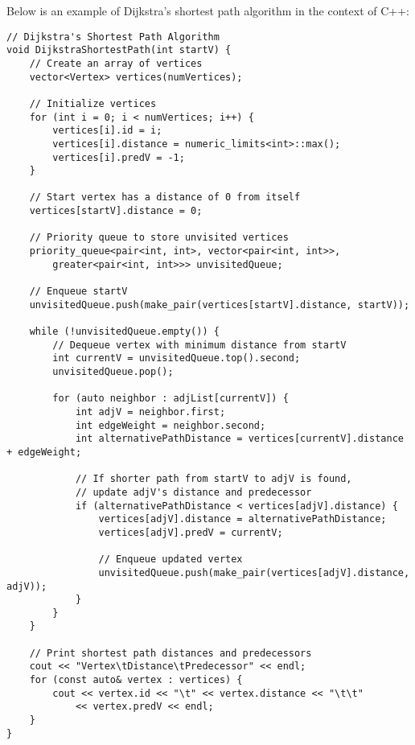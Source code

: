 \begin{solution}

Below is an example of Dijkstra's shortest path algorithm in the context of C++:

\horizontalline

\begin{verbatim}
// Dijkstra's Shortest Path Algorithm
void DijkstraShortestPath(int startV) {
    // Create an array of vertices
    vector<Vertex> vertices(numVertices);

    // Initialize vertices
    for (int i = 0; i < numVertices; i++) {
        vertices[i].id = i;
        vertices[i].distance = numeric_limits<int>::max();
        vertices[i].predV = -1;
    }

    // Start vertex has a distance of 0 from itself
    vertices[startV].distance = 0;

    // Priority queue to store unvisited vertices
    priority_queue<pair<int, int>, vector<pair<int, int>>, 
        greater<pair<int, int>>> unvisitedQueue;

    // Enqueue startV
    unvisitedQueue.push(make_pair(vertices[startV].distance, startV));

    while (!unvisitedQueue.empty()) {
        // Dequeue vertex with minimum distance from startV
        int currentV = unvisitedQueue.top().second;
        unvisitedQueue.pop();

        for (auto neighbor : adjList[currentV]) {
            int adjV = neighbor.first;
            int edgeWeight = neighbor.second;
            int alternativePathDistance = vertices[currentV].distance + edgeWeight;

            // If shorter path from startV to adjV is found,
            // update adjV's distance and predecessor
            if (alternativePathDistance < vertices[adjV].distance) {
                vertices[adjV].distance = alternativePathDistance;
                vertices[adjV].predV = currentV;

                // Enqueue updated vertex
                unvisitedQueue.push(make_pair(vertices[adjV].distance, adjV));
            }
        }
    }

    // Print shortest path distances and predecessors
    cout << "Vertex\tDistance\tPredecessor" << endl;
    for (const auto& vertex : vertices) {
        cout << vertex.id << "\t" << vertex.distance << "\t\t" 
            << vertex.predV << endl;
    }
}
\end{verbatim}


\end{solution}

